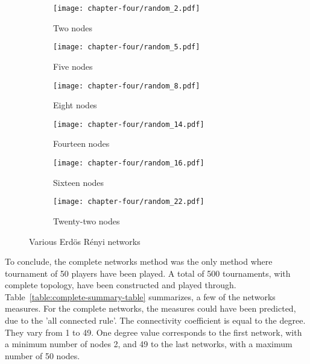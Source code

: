 \begin{figure}[H]
	\centering
	\begin{subfigure}[t]{0.30\textwidth}
		\centering
		\texttt{[image: chapter-four/random\_2.pdf]}
		\caption{Two nodes}
	\end{subfigure}
	\hfill
	\begin{subfigure}[t]{0.30\textwidth}\centering
		\centering
		\texttt{[image: chapter-four/random\_5.pdf]}
		\caption{Five nodes}
	\end{subfigure}
	\hfill
	\begin{subfigure}[t]{0.30\textwidth}\centering
		\centering
		\texttt{[image: chapter-four/random\_8.pdf]}
		\caption{Eight nodes}
	\end{subfigure}
	\hfill
	\begin{subfigure}[t]{0.30\textwidth}\centering
		\centering
		\texttt{[image: chapter-four/random\_14.pdf]}
		\caption{Fourteen nodes}
	\end{subfigure}
	\hfill
	\begin{subfigure}[t]{0.30\textwidth}\centering
		\centering
		\texttt{[image: chapter-four/random\_16.pdf]}
		\caption{Sixteen nodes}
	\end{subfigure}
	\hfill
	\begin{subfigure}[t]{0.30\textwidth}\centering
		\centering
		\texttt{[image: chapter-four/random\_22.pdf]}
		\caption{Twenty-two nodes}
	\end{subfigure}
	\caption{Various Erd\"{o}s R\'{e}nyi networks}
	\label{random_networks_illustration}
\end{figure}

To conclude, the complete networks method was the only method where tournament
of 50 players have been played. A total of 500 tournaments, with complete topology,
have been constructed and played through. Table~\ref{table:complete-summary-table}
summarizes, a few of the networks measures. For the complete networks, the measures
could have been predicted, due to the 'all connected rule'. The connectivity
coefficient is equal to the degree. They vary from 1 to 49. One degree value
corresponds to the first network, with a minimum number of nodes 2, and 49 to
the last networks, with a maximum number of 50 nodes.

